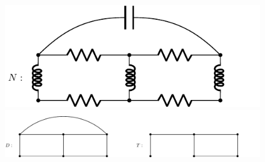 \documentclass{article}
\begin{document}
\begin{figure}
\begin{minipage}{0.99\linewidth}
\centering
\includegraphics[width=0.6\linewidth]{circuitt}
\end{minipage}%
\vfill
\begin{minipage}{0.99\linewidth}
\centering
\includegraphics[width=1.1\linewidth]{circuitb}
\end{minipage}
\end{figure}

\end{document}
